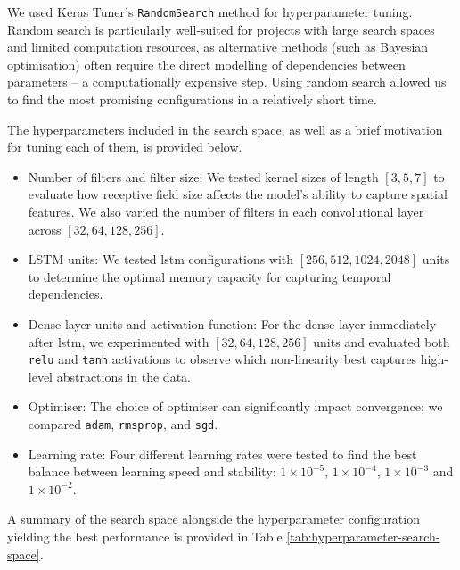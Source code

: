 We used Keras Tuner's \texttt{RandomSearch} method for hyperparameter tuning. Random search is particularly well-suited for projects with large search spaces and limited computation resources, as alternative methods (such as Bayesian optimisation) often require the direct modelling of dependencies between parameters -- a computationally expensive step. Using random search allowed us to find the most promising configurations in a relatively short time.

The hyperparameters included in the search space, as well as a brief motivation for tuning each of them, is provided below. 

\begin{itemize} 
\item Number of filters and filter size: We tested kernel sizes of length $[3, 5, 7]$ to evaluate how receptive field size affects the model's ability to capture spatial features. We also varied the number of filters in each convolutional layer across $[32, 64, 128, 256]$.
\item LSTM units: We tested \acrshort{lstm} configurations with 
$[256, 512, 1024, 2048]$ units to determine the optimal memory capacity for capturing temporal dependencies. 
\item Dense layer units and activation function: For the dense layer immediately after \acrshort{lstm}, we experimented with $[32, 64, 128, 256]$ units and evaluated both \texttt{relu} and \texttt{tanh} activations to observe which non-linearity best captures high-level abstractions in the data. 
\item Optimiser: The choice of optimiser can significantly impact convergence; we compared \texttt{adam}, \texttt{rmsprop}, and \texttt{sgd}. 
\item Learning rate: Four different learning rates were tested to find the best balance between learning speed and stability: $1 \times 10^{-5}$, $1 \times 10^{-4}$, $1 \times 10^{-3}$ and $1 \times 10^{-2}$.
\end{itemize}

A summary of the search space alongside the hyperparameter configuration yielding the best performance is provided in Table \ref{tab:hyperparameter-search-space}.


